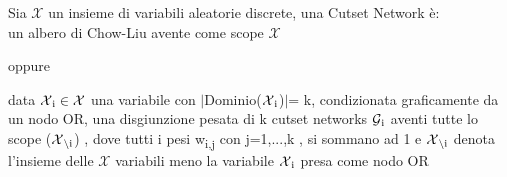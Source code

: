 \documentclass{article}
\begin{document}
\usepackage{fontspec}
\setmainfont{Calibri}
Sia $\mathcal{X}$ un insieme di variabili aleatorie discrete, una Cutset Network è:\\
		 un albero di Chow-Liu avente come scope $\mathcal{X}$\\
		\centerline{oppure}
		 data $\mathcal{X\textsubscript{i} \in X}$ una variabile con $\vert$Dominio($\mathcal{X\textsubscript{i}}$)$\vert$= k, condizionata graficamente da un nodo OR, una disgiunzione pesata di k cutset networks $\mathcal{G\textsubscript{i}}$ aventi tutte lo scope ($\mathcal{X\textsubscript{$\setminus$i}}$) , dove tutti i pesi w\textsubscript{i,j} con j=1,...,k , si sommano ad 1  e $\mathcal{X\textsubscript{$\setminus$i}}$ denota l'insieme delle $\mathcal{X}$ variabili meno la variabile $\mathcal{X\textsubscript{i}}$ presa come nodo OR
\end{document}
